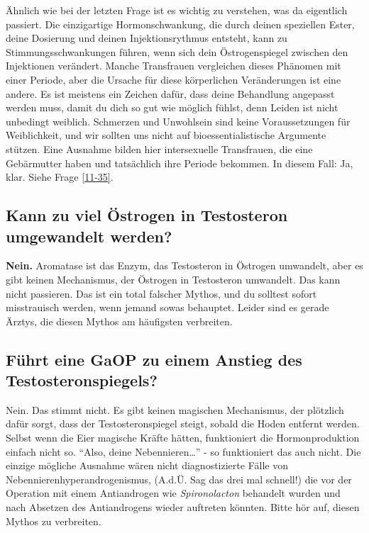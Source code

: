 \documentclass{article}
\begin{document}
Ähnlich wie bei der letzten Frage ist es wichtig zu verstehen, was da eigentlich passiert. Die einzigartige Hormonschwankung, die durch deinen speziellen Ester, deine Dosierung und deinen Injektionsrythmus entsteht, kann zu Stimmungsschwankungen führen, wenn sich dein Östrogenspiegel zwischen den Injektionen verändert. Manche Transfrauen vergleichen dieses Phänomen mit einer Periode, aber die Ursache für diese körperlichen Veränderungen ist eine andere. Es ist meistens ein Zeichen dafür, dass deine Behandlung angepasst werden muss, damit du dich so gut wie möglich fühlst, denn Leiden ist nicht unbedingt weiblich. Schmerzen und Unwohlsein sind keine Voraussetzungen für Weiblichkeit, und wir sollten uns nicht auf bioessentialistische Argumente stützen. Eine Ausnahme bilden hier intersexuelle Transfrauen, die eine Gebärmutter haben und tatsächlich ihre Periode bekommen. In diesem Fall: Ja, klar. Siehe Frage \ref{11-35}.

\subsection{Kann zu viel Östrogen in Testosteron umgewandelt werden?}

\textbf{Nein.} Aromatase ist das Enzym, das Testosteron in Östrogen umwandelt, aber es gibt keinen Mechanismus, der Östrogen in Testosteron umwandelt. Das kann nicht passieren. Das ist ein total falscher Mythos, und du solltest sofort misstrauisch werden, wenn jemand sowas behauptet. Leider sind es gerade Ärztys, die diesen Mythos am häufigsten verbreiten.

\subsection{Führt eine GaOP zu einem Anstieg des Testosteronspiegels?}

Nein. Das stimmt nicht. Es gibt keinen magischen Mechanismus, der plötzlich dafür sorgt, dass der Testosteronspiegel steigt, sobald die Hoden entfernt werden. Selbst wenn die Eier magische Kräfte hätten, funktioniert die Hormonproduktion einfach nicht so. “Also, deine Nebennieren…” - so funktioniert das auch nicht. Die einzige mögliche Ausnahme wären nicht diagnostizierte Fälle von Nebennierenhyperandrogenismus, (A.d.Ü. Sag das drei mal schnell!) die vor der Operation mit einem Antiandrogen wie \textit{Spironolacton} behandelt wurden und nach Absetzen des Antiandrogens wieder auftreten könnten. Bitte hör auf, diesen Mythos zu verbreiten.
\end{document}
